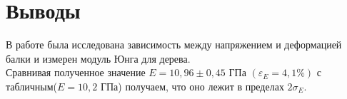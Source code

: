 \documentclass[a4paper]{article}
\begin{document}
\newpage
\section{Выводы}

В работе была исследована зависимость между напряжением и деформацией балки и измерен модуль Юнга для дерева.\\
Сравнивая полученное значение $E = 10,96 \pm 0,45 \text{ ГПа } (\varepsilon_{E} = 4,1\%)$ с табличным($E = 10,2$ ГПа) получаем, что оно лежит в пределах $2\sigma_{E}$.
\end{document}

